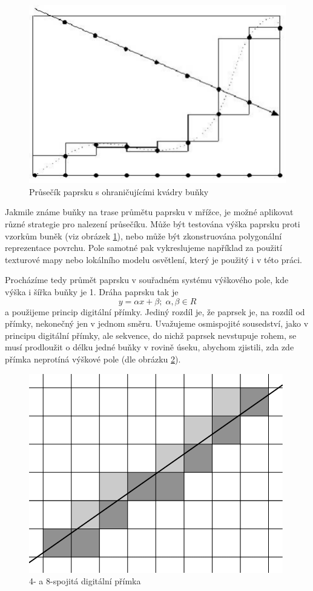 \documentclass[report,11pt]{elsarticle}
\begin{document}
\begin{figure}[h]
\hfill\includegraphics[width=0.6\linewidth]{Intersecting-the-ray-with-the-bounding-heights-of-neigh-boring-cells.png}\hspace*{\fill}
\caption{Průsečík paprsku s ohraničujícími kvádry buňky}
\label{fig:z}
\end{figure}


Jakmile známe buňky na trase průmětu paprsku v mřížce, je možné aplikovat různé strategie pro nalezení průsečíku. Může být testována výška paprsku proti vzorkům buněk (viz obrázek \ref{fig:z}), nebo může být zkonstruována polygonální reprezentace povrchu. Pole samotné pak vykreslujeme například za použití texturové mapy nebo lokálního modelu osvětlení, který je použitý i v této práci.

Procházíme tedy průmět paprsku v souřadném systému výškového pole, kde výška i šířka buňky je 1. Dráha paprsku tak je \[y = \alpha x + \beta; \; \alpha, \beta \in R\] a použijeme princip digitální přímky. Jediný rozdíl je, že paprsek je, na rozdíl od přímky, nekonečný jen v jednom směru. Uvažujeme osmispojité sousedství, jako v principu digitální přímky, ale sekvence, do nichž paprsek nevstupuje rohem, se musí prodloužit o délku jedné buňky v rovině úseku, abychom zjistili, zda zde přímka neprotíná výškové pole (dle obrázku \ref{fig:connected}).


\begin{figure}[h]
\hfill\includegraphics[width=0.35\linewidth]{The-minimal-8-connected-definition-of-the-line.png}\hspace*{\fill}
\caption{4- a 8-spojitá digitální přímka}
\label{fig:connected}
\end{figure}
\end{document}
